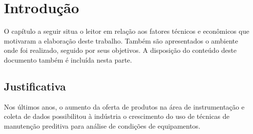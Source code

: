 \documentclass[12pt,openright,twoside,a4paper,
	chapter=TITLE,section=TITLE,
	english,brazil]{abntex2}
\begin{document}
	
	\textual %
	

	\chapter{Introdução}
	O capítulo a seguir situa o leitor em relação aos fatores técnicos e econômicos que motivaram a elaboração deste trabalho. Também são apresentados o ambiente onde foi realizado, seguido por seus objetivos. A disposição do conteúdo deste documento também é incluída nesta parte.
	
	\section{Justificativa}
	Nos últimos anos, o aumento da oferta de produtos na área de instrumentação e coleta de dados possibilitou à indústria o crescimento do uso de técnicas de manutenção preditiva para análise de condições de equipamentos. 
	
	
	\postextual
	
	
		
\end{document}

